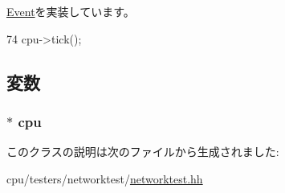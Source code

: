 \hyperlink{classEvent_a142b75b68a6291400e20fb0dd905b1c8}{Event}を実装しています。


\begin{DoxyCode}
74 { cpu->tick(); }
\end{DoxyCode}


\subsection{変数}
\hypertarget{classNetworkTest_1_1TickEvent_a36811e442ce4f0283f33634e61733b28}{
\subsubsection[{cpu}]{$\ast$ {\bf cpu}}}
\label{classNetworkTest_1_1TickEvent_a36811e442ce4f0283f33634e61733b28}


このクラスの説明は次のファイルから生成されました:\begin{DoxyCompactItemize}
\item 
cpu/testers/networktest/\hyperlink{networktest_8hh}{networktest.hh}\end{DoxyCompactItemize}
